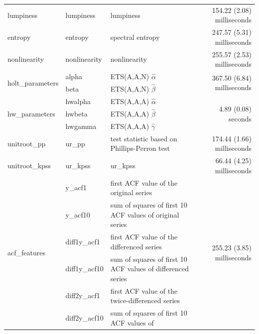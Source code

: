 \documentclass{monashthesis}
\begin{document}
\begin{table}[!h]
{\begin{tabular}{lll|r}
      lumpiness             & \multicolumn{1}{l}{lumpiness} & lumpiness &    154.22 (2.08) milliseconds               \\ 
      entropy             & \multicolumn{1}{l}{entropy} & spectral entropy &    247.57 (5.31) milliseconds              \\ 
     nonlinearity              & \multicolumn{1}{l}{nonlinearity} & nonlinearity &  255.57 (2.53) milliseconds                 \\ \hline
\multirow{2}{*}{holt\_parameters}  & \multicolumn{1}{l}{alpha} & ETS(A,A,N) $\hat\alpha$ & \multirow{2}{*}{367.50 (6.84) milliseconds}  \\ 
                   & \multicolumn{1}{l}{beta} & ETS(A,A,N) $\hat\beta$   &                    \\ \hline
\multirow{3}{*}{hw\_parameters}  & \multicolumn{1}{l}{hwalpha} & ETS(A,A,A) $\hat\alpha$   & \multirow{3}{*}{4.89 (0.08) seconds}  \\ 
                   & \multicolumn{1}{l}{hwbeta} & ETS(A,A,A) $\hat\beta$  &                    \\
                   & \multicolumn{1}{l}{hwgamma} & ETS(A,A,A) $\hat\gamma$  &                    \\ \hline
    unitroot\_pp               & \multicolumn{1}{l}{ur\_pp} & test statistic based on Phillips-Perron test  &           174.44 (1.66) milliseconds      \\ 
 unitroot\_kpss                  & \multicolumn{1}{l}{ur\_kpss} & ur\_kpss &  66.44 (4.25) milliseconds                  \\ \hline
\multirow{7}{*}{acf\_features}  & \multicolumn{1}{l}{y\_acf1} & first ACF value of the original series   & \multirow{7}{*}{255.23 (3.85) milliseconds }  \\
                   & \multicolumn{1}{l}{y\_acf10 } & sum of squares of first 10 ACF values of original series  &                    \\ 
                   & \multicolumn{1}{l}{diff1y\_acf1} & first ACF value of the differenced series  &                    \\ 
                   & \multicolumn{1}{l}{diff1y\_acf10 } &sum of squares of first 10 ACF values of differenced series   &                    \\ 
                   & \multicolumn{1}{l}{diff2y\_acf1} & first ACF value of the twice-differenced series &                    \\ 
                   & \multicolumn{1}{l}{diff2y\_acf10} & sum of squares of first 10 ACF values of &                    \\ 

\end{tabular}}
\end{table}
\end{document}
